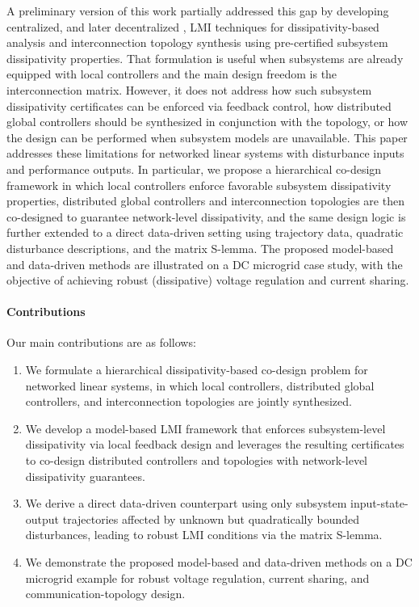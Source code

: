 \documentclass[letterpaper, 10 pt, conference]{ieeeconf}%
\newcommand{\0}{\mathbf{0}}
\begin{document}
A preliminary version of this work \cite{WelikalaP52022} partially addressed this gap by developing centralized, and later decentralized \cite{Welikala2022Ax3}, LMI techniques for dissipativity-based analysis and interconnection topology synthesis using pre-certified subsystem dissipativity properties. That formulation is useful when subsystems are already equipped with local controllers and the main design freedom is the interconnection matrix. However, it does not address how such subsystem dissipativity certificates can be enforced via feedback control, how distributed global controllers should be synthesized in conjunction with the topology, or how the design can be performed when subsystem models are unavailable. This paper addresses these limitations for networked linear systems with disturbance inputs and performance outputs. In particular, we propose a hierarchical co-design framework in which local controllers enforce favorable subsystem dissipativity properties, distributed global controllers and interconnection topologies are then co-designed to guarantee network-level dissipativity, and the same design logic is further extended to a direct data-driven setting using trajectory data, quadratic disturbance descriptions, and the matrix S-lemma. The proposed model-based and data-driven methods are illustrated on a DC microgrid case study, with the objective of achieving robust (dissipative) voltage regulation and current sharing.

\paragraph*{\textbf{Contributions}}
Our main contributions are as follows:
\begin{enumerate}
\item We formulate a hierarchical dissipativity-based co-design problem for networked linear systems, in which local controllers, distributed global controllers, and interconnection topologies are jointly synthesized.
\item We develop a model-based LMI framework that enforces subsystem-level dissipativity via local feedback design and leverages the resulting certificates to co-design distributed controllers and topologies with network-level dissipativity guarantees.
\item We derive a direct data-driven counterpart using only subsystem input-state-output trajectories affected by unknown but quadratically bounded disturbances, leading to robust LMI conditions via the matrix S-lemma.
\item We demonstrate the proposed model-based and data-driven methods on a DC microgrid example for robust voltage regulation, current sharing, and communication-topology design.
\end{enumerate}
\end{document}
